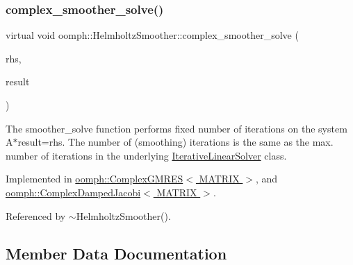 \mbox{\label{classoomph_1_1HelmholtzSmoother_a8ec748270df3e1199f19ef267d5b8e85}} 
\subsubsection{\texorpdfstring{complex\+\_\+smoother\+\_\+solve()}{complex\_smoother\_solve()}}
{\footnotesize\ttfamily virtual void oomph\+::\+Helmholtz\+Smoother\+::complex\+\_\+smoother\+\_\+solve (\begin{DoxyParamCaption}\item[{const \hyperlink{classoomph_1_1Vector}{Vector}$<$ \hyperlink{classoomph_1_1DoubleVector}{Double\+Vector} $>$ \&}]{rhs,  }\item[{\hyperlink{classoomph_1_1Vector}{Vector}$<$ \hyperlink{classoomph_1_1DoubleVector}{Double\+Vector} $>$ \&}]{result }\end{DoxyParamCaption})\hspace{0.3cm}{\ttfamily [pure virtual]}}



The smoother\+\_\+solve function performs fixed number of iterations on the system A$\ast$result=rhs. The number of (smoothing) iterations is the same as the max. number of iterations in the underlying \hyperlink{classoomph_1_1IterativeLinearSolver}{Iterative\+Linear\+Solver} class. 



Implemented in \hyperlink{classoomph_1_1ComplexGMRES_a874520bc44cd8127497d972373938df9}{oomph\+::\+Complex\+G\+M\+R\+E\+S$<$ M\+A\+T\+R\+I\+X $>$}, and \hyperlink{classoomph_1_1ComplexDampedJacobi_a3e548db0f775e4239ff7b9c76a7b1c76}{oomph\+::\+Complex\+Damped\+Jacobi$<$ M\+A\+T\+R\+I\+X $>$}.



Referenced by $\sim$\+Helmholtz\+Smoother().



\subsection{Member Data Documentation}
\mbox{\label{classoomph_1_1HelmholtzSmoother_a2b4b16dcb611cb27371afa1636e125cf}} 
